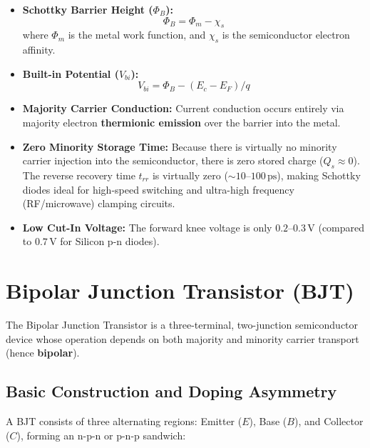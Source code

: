 \documentclass[12pt,a4paper]{article}
\begin{document}
\begin{itemize}[leftmargin=*, itemsep=3pt]
  \item \textbf{Schottky Barrier Height ($\Phi_B$):}
  \begin{equation}
    \Phi_B = \Phi_m - \chi_s
  \end{equation}
  where $\Phi_m$ is the metal work function, and $\chi_s$ is the semiconductor electron affinity.
  \item \textbf{Built-in Potential ($V_{bi}$):}
  \begin{equation}
    V_{bi} = \Phi_B - (E_c - E_F) / q
  \end{equation}
  \item \textbf{Majority Carrier Conduction:} Current conduction occurs entirely via majority electron \textbf{thermionic emission} over the barrier into the metal.
  \item \textbf{Zero Minority Storage Time:} Because there is virtually no minority carrier injection into the semiconductor, there is zero stored charge ($Q_s \approx 0$). The reverse recovery time $t_{rr}$ is virtually zero ($\sim 10\text{--}100\,\text{ps}$), making Schottky diodes ideal for high-speed switching and ultra-high frequency (RF/microwave) clamping circuits.
  \item \textbf{Low Cut-In Voltage:} The forward knee voltage is only $0.2\text{--}0.3\,\text{V}$ (compared to $0.7\,\text{V}$ for Silicon p-n diodes).
\end{itemize}

\section{Bipolar Junction Transistor (BJT)}

The Bipolar Junction Transistor is a three-terminal, two-junction semiconductor device whose operation depends on both majority and minority carrier transport (hence \textbf{bipolar}).

\subsection{Basic Construction and Doping Asymmetry}
A BJT consists of three alternating regions: Emitter ($E$), Base ($B$), and Collector ($C$), forming an n-p-n or p-n-p sandwich:
\end{document}
